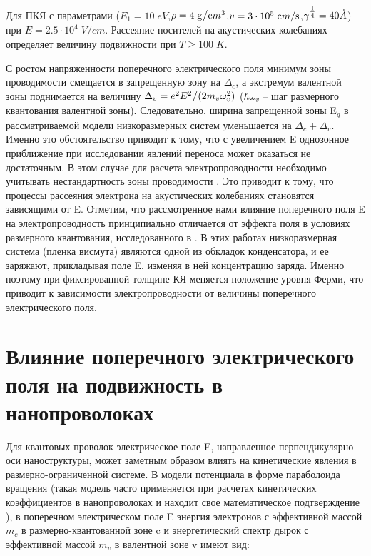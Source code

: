 Для ПКЯ с параметрами ($E_{1} =10{\mathrm \; eV}$,$\rho =4{\mathrm \; }{{\mathrm g} \mathord{\left/{\vphantom{{\mathrm g} {\mathrm cm}^{{\mathrm 3}} }}\right.\kern-\nulldelimiterspace} {\mathrm cm}^{{\mathrm 3}} } $,$v=3\cdot 10^{5} {\mathrm \; }{{\mathrm cm} \mathord{\left/{\vphantom{{\mathrm cm} {\mathrm s}}}\right.\kern-\nulldelimiterspace} {\mathrm s}} $,$\gamma ^{{\tfrac{1}{4}} } =40 \AA$) при $E=2.5\cdot 10^{4} {\mathrm \; V/cm}$. Рассеяние носителей на акустических колебаниях определяет величину подвижности при $T\ge 100{\mathrm \; K}$.

С ростом напряженности поперечного электрического поля минимум зоны проводимости смещается в запрещенную зону на $\Delta _{c} $, а экстремум валентной зоны поднимается на величину $\Delta _{v} ={e^{2} E^{2}  \mathord{\left/{\vphantom{e^{2} E^{2}  (2m_{v} }}\right.\kern-\nulldelimiterspace} (2m_{v} } \omega _{v}^{2} )$ ($\hbar \omega _{v} $ -- шаг размерного квантования валентной зоны). Следовательно, ширина запрещенной зоны E${}_{g}$ в рассматриваемой модели низкоразмерных систем уменьшается на $\Delta _{c} +\Delta _{v} $. Именно это обстоятельство приводит к тому, что с увеличением E однозонное приближение при исследовании явлений переноса может оказаться не достаточным. В этом случае для расчета электропроводности необходимо учитывать нестандартность зоны проводимости \cite{Lax1960,Cohen1961}. Это приводит к тому, что процессы рассеяния электрона на акустических колебаниях становятся зависящими от E. Отметим, что рассмотренное нами влияние поперечного поля E на электропроводность принципиально отличается от эффекта поля в условиях размерного квантования, исследованного в \cite{Sandomirsky1967,Butenko1998}. В этих работах низкоразмерная система (пленка висмута) являются одной из обкладок конденсатора, и ее заряжают, прикладывая поле E, изменяя в ней концентрацию заряда. Именно поэтому при фиксированной толщине КЯ меняется положение уровня Ферми, что приводит к зависимости электропроводности от величины поперечного электрического поля.

\section{Влияние поперечного электрического поля на подвижность в нанопроволоках} \label{sect4_2}

Для квантовых проволок электрическое поле E, направленное перпендикулярно оси наноструктуры, может заметным образом влиять на кинетические явления в размерно-ограниченной системе. В модели потенциала в форме параболоида вращения (такая модель часто применяется при расчетах кинетических коэффициентов в нанопроволоках \cite{Geiler1998,Cros1992} и находит свое математическое подтверждение \cite{Beenakker1991}), в поперечном электрическом поле E энергия электронов с эффективной массой $m_{c} $ в размерно-квантованной зоне c и энергетический спектр дырок с эффективной массой $m_{v} $ в валентной зоне v имеют вид:


